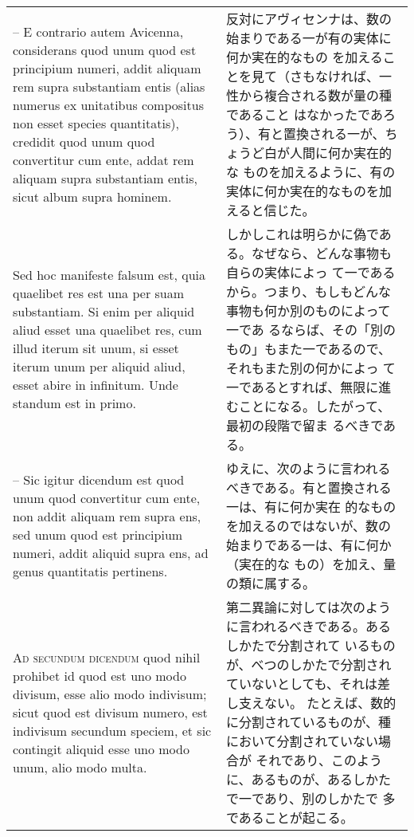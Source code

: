 \documentclass[10pt]{jsarticle} %
\begin{document}
\begin{longtable}{p{21em}p{21em}}
\\

-- E contrario autem Avicenna, considerans quod unum quod est principium
numeri, addit aliquam rem supra substantiam entis (alias numerus ex
unitatibus compositus non esset species quantitatis), credidit quod unum
quod convertitur cum ente, addat rem aliquam supra substantiam entis,
sicut album supra hominem.  

&

反対にアヴィセンナは、数の始まりである一が有の実体に何か実在的なもの
を加えることを見て（さもなければ、一性から複合される数が量の種であること
はなかったであろう）、有と置換される一が、ちょうど白が人間に何か実在的な
ものを加えるように、有の実体に何か実在的なものを加えると信じた。


\\


Sed hoc manifeste falsum est, quia quaelibet res est una per suam
substantiam. Si enim per aliquid aliud esset una quaelibet res, cum
illud iterum sit unum, si esset iterum unum per aliquid aliud, esset
abire in infinitum. Unde standum est in primo.

&

しかしこれは明らかに偽である。なぜなら、どんな事物も自らの実体によっ
て一であるから。つまり、もしもどんな事物も何か別のものによって一であ
るならば、その「別のもの」もまた一であるので、それもまた別の何かによっ
て一であるとすれば、無限に進むことになる。したがって、最初の段階で留ま
るべきである。

\\


-- Sic igitur dicendum est quod unum quod convertitur cum ente, non addit
aliquam rem supra ens, sed unum quod est principium numeri, addit
aliquid supra ens, ad genus quantitatis pertinens.

&

ゆえに、次のように言われるべきである。有と置換される一は、有に何か実在
的なものを加えるのではないが、数の始まりである一は、有に何か（実在的な
もの）を加え、量の類に属する。

\\



{\scshape Ad secundum dicendum} quod nihil prohibet id quod est uno modo
divisum, esse alio modo indivisum; sicut quod est divisum numero, est
indivisum secundum speciem, et sic contingit aliquid esse uno modo unum,
alio modo multa.

&

第二異論に対しては次のように言われるべきである。あるしかたで分割されて
いるものが、べつのしかたで分割されていないとしても、それは差し支えない。
たとえば、数的に分割されているものが、種において分割されていない場合が
それであり、このように、あるものが、あるしかたで一であり、別のしかたで
多であることが起こる。


\end{longtable}
\end{document}
